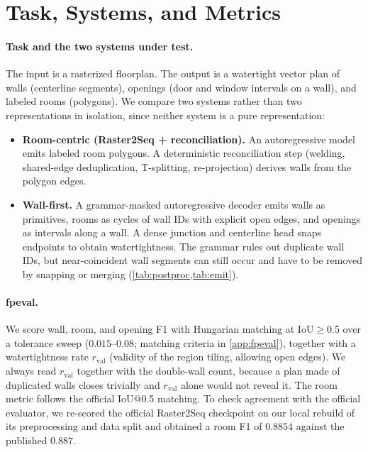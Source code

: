 \documentclass{article}
\begin{document}
\section{Task, Systems, and Metrics}\label{sec:metrics}
\paragraph{Task and the two systems under test.}
The input is a rasterized floorplan. The output is a watertight vector plan of
walls (centerline segments), openings (door and window intervals on a wall),
and labeled rooms (polygons). We compare two systems rather than two
representations in isolation, since neither system is a pure representation:
\begin{itemize}
\item \textbf{Room-centric (Raster2Seq + reconciliation).} An autoregressive
  model emits labeled room polygons. A deterministic reconciliation step
  (welding, shared-edge deduplication, T-splitting, re-projection) derives walls
  from the polygon edges.
\item \textbf{Wall-first.} A grammar-masked autoregressive decoder emits walls
  as primitives, rooms as cycles of wall IDs with explicit open edges, and
  openings as intervals along a wall. A dense junction and centerline head snaps
  endpoints to obtain watertightness. The grammar rules out duplicate wall IDs, but near-coincident wall segments can still occur and have to be removed
  by snapping or merging (\cref{tab:postproc,tab:emit}).
\end{itemize}

\paragraph{fpeval.}
We score wall, room, and opening F1 with Hungarian matching at IoU$\ge$0.5 over
a tolerance sweep ($0.015$--$0.08$; matching criteria in \cref{app:fpeval}),
together with a watertightness rate
$r_{\mathrm{val}}$ (validity of the region tiling, allowing open edges). We
always read $r_{\mathrm{val}}$ together with the double-wall count, because a
plan made of duplicated walls closes trivially and $r_{\mathrm{val}}$ alone
would not reveal it. The room metric follows the official IoU@0.5 matching. To
check agreement with the official evaluator, we re-scored the official
Raster2Seq checkpoint on our local rebuild of its preprocessing and data split
and obtained a room F1 of $0.8854$ against the published $0.887$.
\end{document}
